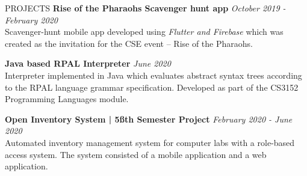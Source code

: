 \documentclass{cv}
\begin{document}
\begin{rSection}{PROJECTS}
    {\bf Rise of the Pharaohs Scavenger hunt app}                   \hfill {\em October 2019 - February 2020}
    \\
    Scavenger-hunt mobile app developed using \textit{Flutter and Firebase} which was created as the invitation
    for the CSE event – Rise of the Pharaohs.
    \\ 
    \par\vspace{7pt}

    {\bf Java based RPAL Interpreter}     \hfill {\em June 2020}
    \\
    Interpreter implemented in Java which evaluates abstract syntax trees according
    to the RPAL language grammar specification. Developed as part of the CS3152 Programming Languages module.
    \\ 
    \par\vspace{7pt}

    {\bf Open Inventory System | 5\ss{th} Semester Project}     \hfill {\em February 2020 - June 2020}
    \\
    Automated inventory management system for computer labs with a role-based access system.
    The system consisted of a mobile application and a web application.
    \\ 
    \par



\end{rSection}
\end{document}
